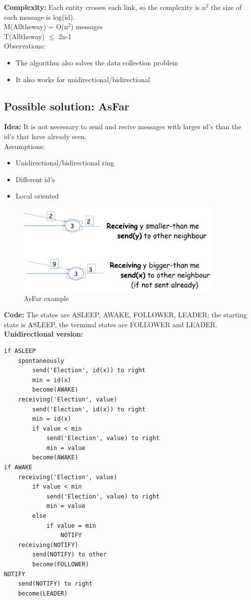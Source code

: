 \documentclass[paper=a4, fontsize=11pt]{scrartcl} %
\numberwithin{equation}{section} %
\numberwithin{figure}{section} %
\numberwithin{table}{section} %
\begin{document}
\textbf{Complexity:} Each entity crosses each link, so the complexity is n$^2$ the size of each message is log(id).\\
M(Alltheway) = O(n$^2$) messages\\
T(Alltheway) $\leq$ 2n-1\\
Observations:
\begin{itemize}
\item The algorithm also solves the data collection problem
\item It also works for unidirectional/bidirectional
\end{itemize}
\subsection*{Possible solution: AsFar}
\textbf{Idea:} It is not necessary to send and recive messages with larger id's than the id's that have already seen.\\
Assumptions:
\begin{itemize}
\item Unidirectional/bidirectional ring
\item Different id's
\item Local oriented
\end{itemize}
\begin{figure}[H]
  \centering
  \includegraphics[width=0.9\textwidth]{img/asfar.png}
  \caption{AsFar example}
  \label{fig:boat1}
\end{figure}
\textbf{Code:} The states are ASLEEP, AWAKE, FOLLOWER, LEADER; the starting state is ASLEEP, the terminal states are FOLLOWER and LEADER.\\
\textbf{Unidirectional version:}
\begin{lstlisting}
if ASLEEP
	spontaneously
		send('Election', id(x)) to right
		min = id(x)
		become(AWAKE)
	receiving('Election', value)
		send('Election', id(x)) to right
		min = id(x)
		if value < min
			send('Election', value) to right
			min = value
		become(AWAKE)		
if AWAKE
	receiving('Election', value)
		if value < min
			send('Election', value) to right
			min = value
		else
			if value = min
				NOTIFY
	receiving(NOTIFY)
		send(NOTIFY) to other
		become(FOLLOWER)
NOTIFY
	send(NOTIFY) to right
	become(LEADER)						
\end{lstlisting}
\end{document}
